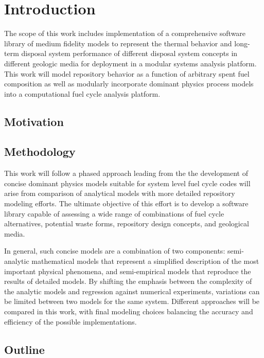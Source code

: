 \chapter{Introduction}
The scope of this work includes implementation of a comprehensive software library of
medium fidelity models to represent the thermal behavior and long-term disposal system
performance of different disposal system concepts in different geologic media for deployment in a 
modular systems analysis platform. This work will model repository behavior as a function of 
arbitrary spent fuel composition as well as modularly incorporate dominant physics process models 
into a computational fuel cycle analysis platform.

\section{Motivation}



\section{Methodology}
This work will follow a phased approach leading from the the development of concise dominant physics 
models suitable for system level fuel cycle codes will arise from comparison of analytical models 
with more detailed repository modeling efforts. The ultimate objective of this effort is to
develop a software library capable of assessing a wide range of combinations of fuel cycle
alternatives, potential waste forms, repository design concepts, and geological media. 

In general, such concise models are a combination of two components: semi-analytic
mathematical models that represent a simplified description of the most important physical 
phenomena, and semi-empirical models that reproduce the results of detailed models.
By shifting the emphasis between the complexity of the analytic models and regression against 
numerical experiments, variations can be limited
between two models for the same system.  Different approaches will be compared in this
work, with final modeling choices balancing the accuracy and efficiency of the possible
implementations.

\section{Outline}


